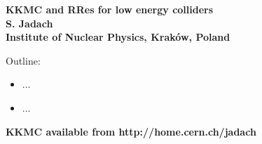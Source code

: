 \documentclass[dvips]{seminar}                      %
\begin{document}


\def\title{{\large KKMC and RRes for low energy colliders}}


\begin{slide}

\begin{center}
{\LARGE\bf\crd   KKMC and RRes for low energy colliders}\\
\vspace{2mm}
{\LARGE\bf\cbl   S. Jadach}\\
\vspace{2mm}
{\large\bf       Institute of Nuclear Physics, Krak\'ow, Poland}
\end{center}

\vspace{10mm}
{\small\Cmar
  Outline:
  \begin{itemize}
  \item
    ...
  \item
    ...
  \end{itemize}
}

{\cbl\small\bf KKMC available from  http://home.cern.ch/jadach}
\vfill
\end{slide}   %
\end{document}
